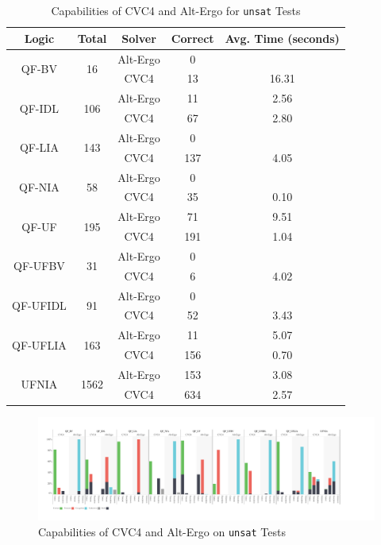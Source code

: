 \documentclass[10pt,twocolumn,letter]{article}
\theoremstyle{definition}
\begin{document}
\begin{table}[!ht]
\small
\centering
\begin{tabular}{|cc|c|cc|}
\hline
  Logic &  Total &Solver & Correct & Avg. Time (seconds) \\\hline
  \multirow{2}{*}{QF-BV} &\multirow{2}{*}{16} & Alt-Ergo & 0 &  \\
  && CVC4 & 13 & 16.31 \\\hline
  \multirow{2}{*}{QF-IDL} &\multirow{2}{*}{106} & Alt-Ergo & 11 & 2.56\\
  &&  CVC4 & 67 & 2.80 \\\hline
  \multirow{2}{*}{QF-LIA} &\multirow{2}{*}{143} & Alt-Ergo & 0 & \\
  && CVC4 & 137 & 4.05\\\hline
  \multirow{2}{*}{QF-NIA} &\multirow{2}{*}{58} &  Alt-Ergo & 0 & \\
  & &  CVC4 & 35 & 0.10\\\hline
  \multirow{2}{*}{QF-UF} & \multirow{2}{*}{195} & Alt-Ergo & 71 & 9.51\\
  &  & CVC4 &191 & 1.04\\\hline
  \multirow{2}{*}{QF-UFBV} &  \multirow{2}{*}{31} &  Alt-Ergo & 0 & \\
  &  & CVC4 & 6 & 4.02\\\hline
  \multirow{2}{*}{QF-UFIDL} & \multirow{2}{*}{91} & Alt-Ergo & 0 & \\
  &  & CVC4 & 52 & 3.43\\\hline
  \multirow{2}{*}{QF-UFLIA} & \multirow{2}{*}{163} & Alt-Ergo & 11 & 5.07\\
  &  & CVC4 & 156 & 0.70\\\hline
  \multirow{2}{*}{UFNIA} & \multirow{2}{*}{1562} &Alt-Ergo & 153 & 3.08\\
  &  & CVC4 & 634 & 2.57\\\hline
\end{tabular}
\caption{Capabilities of CVC4 and Alt-Ergo for {\tt unsat} Tests}
\label{t:eff}
\end{table}


\begin{figure}
\centering
\includegraphics[scale=0.45]{./testanalysis/unsatcap.pdf}
\caption{Capabilities of CVC4 and Alt-Ergo on {\tt unsat} Tests}
\label{f:unsatcap}
\end{figure}
\end{document}
